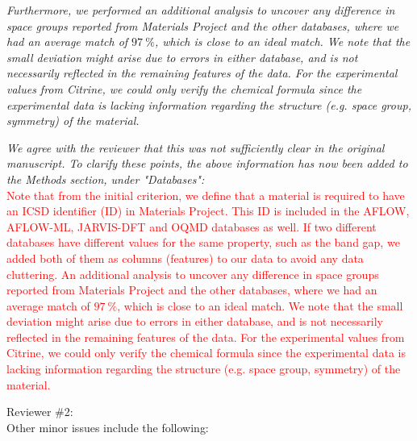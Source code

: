 \documentclass[11pt, a4paper]{letter} %
\newcommand{\mrk}[1]{\textcolor{red}{#1}}
\begin{document}

\textit{Furthermore, we performed an additional analysis to uncover any difference in space groups reported from Materials Project and the other databases, where we had an average match of $97 \ \%$, which is close to an ideal match. We note that the small deviation might arise due to errors in either database, and is not necessarily reflected in the remaining features of the data. For the experimental values from Citrine, we could only verify the chemical formula since the experimental data is lacking information regarding the structure (e.g. space group, symmetry) of the material.}

\textit{We agree with the reviewer that this was not sufficiently clear in the original manuscript. To clarify these points, the above information has now been added to the Methods section, under "Databases": } \\ 
\mrk{Note that from the initial criterion, we define that a material is required to have an ICSD identifier (ID) in Materials Project. This ID is included in the AFLOW,  AFLOW-ML, JARVIS-DFT and OQMD databases as well. If two different databases have different values for the same property, such as the band gap, we added both of them as columns (features) to our data to avoid any data cluttering. An additional analysis to uncover any difference in space groups reported from Materials Project and the other databases, where we had an average match of $97 \ \%$, which is close to an ideal match. We note that the small deviation might arise due to errors in either database, and is not necessarily reflected in the remaining features of the data. For the experimental values from Citrine, we could only verify the chemical formula since the experimental data is lacking information regarding the structure (e.g. space group, symmetry) of the material.}

Reviewer \#2: \\
Other minor issues include the following: 
\end{document}
